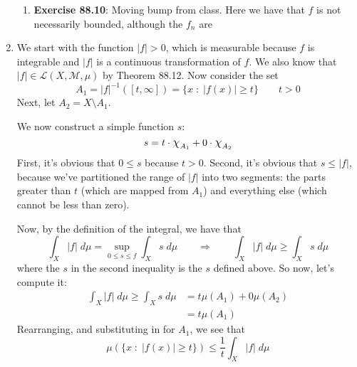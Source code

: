 \documentclass[12pt]{article}
\theoremstyle{plain}
\theoremstyle{definition}
\theoremstyle{remark}
\newcommand*{\Chi}{\mbox{\large$\chi$}} %
\begin{document}
\begin{enumerate}
\begin{enumerate}
\item \textbf{Exercise 88.10}: Moving bump from class. Here we have that $f$ is not necessarily bounded, although the $f_n$ are
\end{enumerate}

\item We start with the function $|f|>0$, which is measurable because $f$ is integrable and $|f|$ is a continuous transformation of $f$. We also know that $|f|\in\mathscr{L}(X,\mathscr{M},\mu)$ by Theorem 88.12. Now consider the set
\[
    A_1 = |f|^{-1}([t,\infty]) = \{x \;:\; |f(x)|\geq t\}
    \qquad t>0
\]
Next, let $A_2 = X\setminus A_1$. 

We now construct a simple function $s$:
\[
    s = t\cdot \Chi_{A_1} + 0 \cdot \Chi_{A_2}
\]
First, it's obvious that $0\leq s$ because $t>0$. Second, it's obvious that $s\leq |f|$, because we've partitioned the range of $|f|$ into two segments: the parts greater than $t$ (which are mapped from $A_1$) and everything else (which cannot be less than zero).

Now, by the definition of the integral, we have that 
\[
    \int_X |f| \; d\mu = \sup_{0\leq s \leq f} \int_X s\;d\mu
    \qquad\Rightarrow\qquad
    \int_X |f| \; d\mu \geq \int_X s\;d\mu
\]
where the $s$ in the second inequality is the $s$ defined above. So now, let's compute it:
\begin{align*}
    \int_X |f| \; d\mu \geq \int_X s\;d\mu
    &= t \mu(A_1) + 0 \mu(A_2) \\
    &= t \mu(A_1) 
\end{align*}
Rearranging, and substituting in for $A_1$, we see that
\begin{equation}
    \mu\left(\{x \;:\; |f(x)|\geq t\}\right) \leq
    \frac{1}{t}\int_X |f| \; d\mu 
\end{equation}




\end{enumerate}
\end{document}

